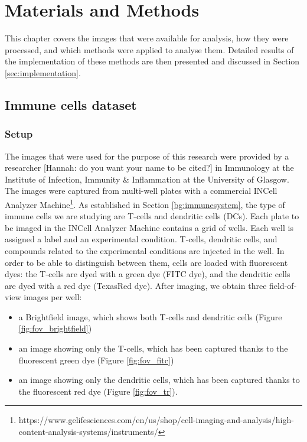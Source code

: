 
\chapter{Materials and Methods} \label{sec:mm}

This chapter covers the images that were available for analysis, how they were processed, and which methods were applied to analyse them. Detailed results of the implementation of these methods are then presented and discussed in Section \ref{sec:implementation}.

\section{Immune cells dataset}

\subsection{Setup}

The images that were used for the purpose of this research were provided by a researcher [Hannah: do you want your name to be cited?] in Immunology at the Institute of Infection, Immunity \& Inflammation at the University of Glasgow. The images were captured from multi-well plates with a commercial INCell Analyzer Machine\footnote{https://www.gelifesciences.com/en/us/shop/cell-imaging-and-analysis/high-content-analysis-systems/instruments/}. As established in Section \ref{bg:immunesystem}, the type of immune cells we are studying are T-cells and dendritic cells (DCs). Each plate to be imaged in the INCell Analyzer Machine contains a grid of wells. Each well is assigned a label and an experimental condition. T-cells, dendritic cells, and compounds related to the experimental conditions are injected in the well. In order to be able to distinguish between them, cells are loaded with fluorescent dyes: the T-cells are dyed with a green dye (FITC dye), and the dendritic cells are dyed with a red dye (TexasRed dye). After imaging, we obtain three field-of-view images per well:

\begin{itemize}
    \item a Brightfield image, which shows both T-cells and dendritic cells (Figure \ref{fig:fov_brightfield})
    \item an image showing only the T-cells, which has been captured thanks to the fluorescent green dye (Figure \ref{fig:fov_fitc})
    \item an image showing only the dendritic cells, which has been captured thanks to the fluorescent red dye (Figure \ref{fig:fov_tr}).
\end{itemize}

